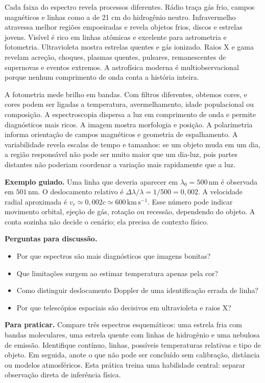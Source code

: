 \documentclass[11pt,a4paper]{article}
\begin{document}
Cada faixa do espectro revela processos diferentes. Rádio traça gás frio, campos magnéticos e linhas como a de 21 cm do hidrogênio neutro. Infravermelho atravessa melhor regiões empoeiradas e revela objetos frios, discos e estrelas jovens. Visível é rico em linhas atômicas e excelente para astrometria e fotometria. Ultravioleta mostra estrelas quentes e gás ionizado. Raios X e gama revelam acreção, choques, plasmas quentes, pulsares, remanescentes de supernovas e eventos extremos. A astrofísica moderna é multiobservacional porque nenhum comprimento de onda conta a história inteira.

A fotometria mede brilho em bandas. Com filtros diferentes, obtemos cores, e cores podem ser ligadas a temperatura, avermelhamento, idade populacional ou composição. A espectroscopia dispersa a luz em comprimento de onda e permite diagnósticos mais ricos. A imagem mostra morfologia e posição. A polarimetria informa orientação de campos magnéticos e geometria de espalhamento. A variabilidade revela escalas de tempo e tamanhos: se um objeto muda em um dia, a região responsável não pode ser muito maior que um dia-luz, pois partes distantes não poderiam coordenar a variação mais rapidamente que a luz.

\textbf{Exemplo guiado.} Uma linha que deveria aparecer em $\lambda_0=500\,\mathrm{nm}$ é observada em $501\,\mathrm{nm}$. O deslocamento relativo é $\Delta\lambda/\lambda=1/500=0{,}002$. A velocidade radial aproximada é $v_r\simeq0{,}002c\simeq600\,\mathrm{km\,s^{-1}}$. Esse número pode indicar movimento orbital, ejeção de gás, rotação ou recessão, dependendo do objeto. A conta sozinha não decide o cenário; ela precisa de contexto físico.

\textbf{Perguntas para discussão.}
\begin{itemize}
\item Por que espectros são mais diagnósticos que imagens bonitas?
\item Que limitações surgem ao estimar temperatura apenas pela cor?
\item Como distinguir deslocamento Doppler de uma identificação errada de linha?
\item Por que telescópios espaciais são decisivos em ultravioleta e raios X?
\end{itemize}

\textbf{Para praticar.} Compare três espectros esquemáticos: uma estrela fria com bandas moleculares, uma estrela quente com linhas de hidrogênio e uma nebulosa de emissão. Identifique contínuo, linhas, possíveis temperaturas relativas e tipo de objeto. Em seguida, anote o que não pode ser concluído sem calibração, distância ou modelos atmosféricos. Esta prática treina uma habilidade central: separar observação direta de inferência física.
\end{document}
